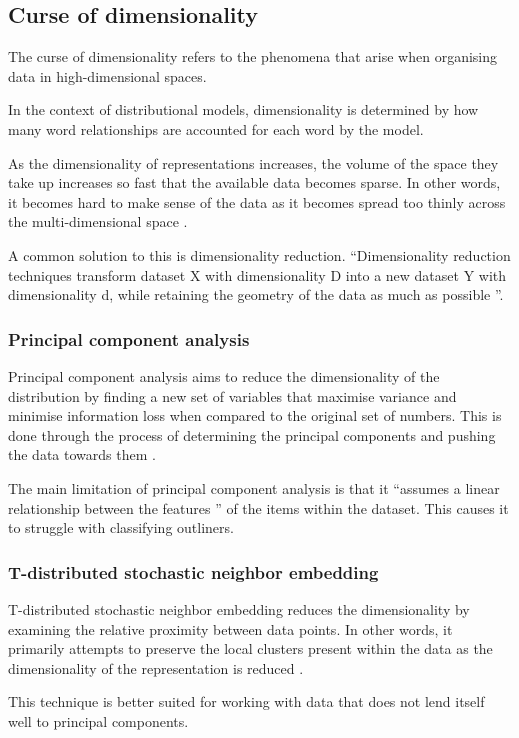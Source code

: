 \documentclass[14pt, a4paper]{extreport}
\begin{document}
    \subsection{Curse of dimensionality}
The curse of dimensionality refers to the phenomena that arise when organising data in high-dimensional spaces.

In the context of distributional models, dimensionality is determined by how many word relationships are accounted for each word by the model.

As the dimensionality of representations increases, the volume of the space they take up increases so fast that the available data becomes sparse. In other words, it becomes hard to make sense of the data as it becomes spread too thinly across the multi-dimensional space \parencite{venkat}.

A common solution to this is dimensionality reduction. ``Dimensionality reduction techniques transform dataset X with dimensionality D into a new dataset Y with dimensionality d, while retaining the geometry of the data as much as possible \parencite{sorzano}''.
      \subsubsection{Principal component analysis}
Principal component analysis aims to reduce the dimensionality of the distribution by finding a new set of variables that maximise variance and minimise information loss when compared to the original set of numbers. This is done through the process of determining the principal components and pushing the data towards them \parencite{richardson}.

The main limitation of principal component analysis is that it ``assumes a linear relationship between the features \parencite{hoz}'' of the items within the dataset. This causes it to struggle with classifying outliners.
      \subsubsection{T-distributed stochastic neighbor embedding}
T-distributed stochastic neighbor embedding reduces the dimensionality by examining the relative proximity between data points. In other words, it primarily attempts to preserve the local clusters present within the data as the dimensionality of the representation is reduced \parencite{van}.

This technique is better suited for working with data that does not lend itself well to principal components.
\end{document}
